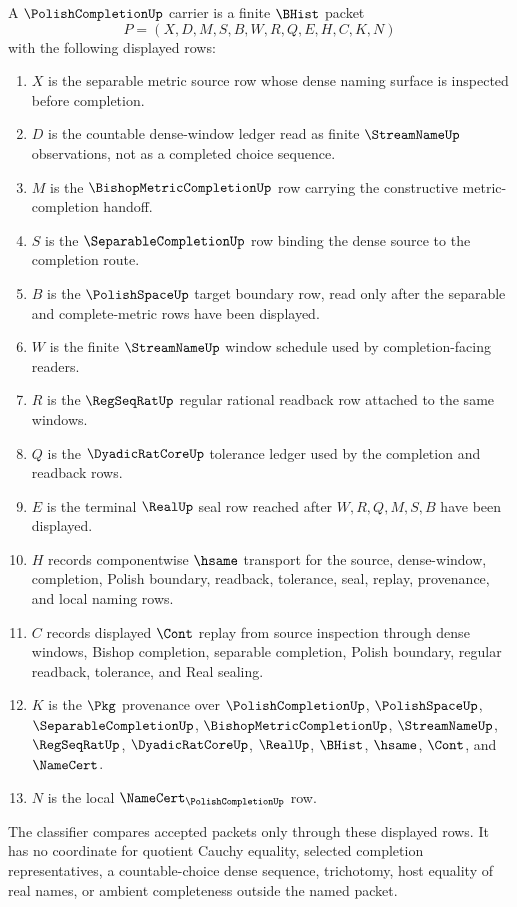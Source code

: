 \begin{definition}
\label{def:polish-completion-carrier}
A $\PolishCompletionUp$ carrier is a finite $\BHist$ packet
$$
P=(X,D,M,S,B,W,R,Q,E,H,C,K,N)
$$
with the following displayed rows:
\begin{enumerate}
\item $X$ is the separable metric source row whose dense naming surface is inspected before completion.
\item $D$ is the countable dense-window ledger read as finite $\StreamNameUp$ observations, not as a completed choice sequence.
\item $M$ is the $\BishopMetricCompletionUp$ row carrying the constructive metric-completion handoff.
\item $S$ is the $\SeparableCompletionUp$ row binding the dense source to the completion route.
\item $B$ is the $\PolishSpaceUp$ target boundary row, read only after the separable and complete-metric rows have been displayed.
\item $W$ is the finite $\StreamNameUp$ window schedule used by completion-facing readers.
\item $R$ is the $\RegSeqRatUp$ regular rational readback row attached to the same windows.
\item $Q$ is the $\DyadicRatCoreUp$ tolerance ledger used by the completion and readback rows.
\item $E$ is the terminal $\RealUp$ seal row reached after $W,R,Q,M,S,B$ have been displayed.
\item $H$ records componentwise $\hsame$ transport for the source, dense-window, completion, Polish boundary, readback, tolerance, seal, replay, provenance, and local naming rows.
\item $C$ records displayed $\Cont$ replay from source inspection through dense windows, Bishop completion, separable completion, Polish boundary, regular readback, tolerance, and Real sealing.
\item $K$ is the $\Pkg$ provenance over $\PolishCompletionUp$, $\PolishSpaceUp$, $\SeparableCompletionUp$, $\BishopMetricCompletionUp$, $\StreamNameUp$, $\RegSeqRatUp$, $\DyadicRatCoreUp$, $\RealUp$, $\BHist$, $\hsame$, $\Cont$, and $\NameCert$.
\item $N$ is the local $\NameCert_{\PolishCompletionUp}$ row.
\end{enumerate}
The classifier compares accepted packets only through these displayed rows. It has no coordinate for quotient Cauchy equality, selected completion representatives, a countable-choice dense sequence, trichotomy, host equality of real names, or ambient completeness outside the named packet.
\end{definition}

